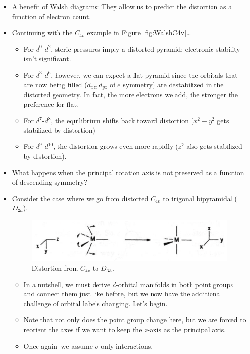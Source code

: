 \documentclass[../notes.tex]{subfiles}
\begin{document}
\begin{itemize}
\begin{itemize}
    \end{itemize}
    \item A benefit of Walsh diagrams: They allow us to predict the distortion as a function of electron count.
    \item Continuing with the $C_{4v}$ example in Figure \ref{fig:WalshC4v}\dots
    \begin{itemize}
        \item For $d^0$-$d^2$, steric pressures imply a distorted pyramid; electronic stability isn't significant.
        \item For $d^3$-$d^6$, however, we can expect a flat pyramid since the orbitals that are now being filled ($d_{xz},d_{yz}$ of $e$ symmetry) are destabilized in the distorted geometry. In fact, the more electrons we add, the stronger the preference for flat.
        \item For $d^7$-$d^8$, the equilibrium shifts back toward distortion ($x^2-y^2$ gets stabilized by distortion).
        \item For $d^9$-$d^{10}$, the distortion grows even more rapidly ($z^2$ also gets stabilized by distortion).
    \end{itemize}
    \item What happens when the principal rotation axis is not preserved as a function of descending symmetry?
    \item Consider the case where we go from distorted $C_{4v}$ to trigonal bipyramidal ($D_{3h}$).
    \begin{figure}[h!]
        \centering
        \includegraphics[width=0.5\linewidth]{../ExtFiles/DistortC4vD3h.png}
        \caption{Distortion from $C_{4v}$ to $D_{3h}$.}
        \label{fig:DistortC4vD3h}
    \end{figure}
    \begin{itemize}
        \item In a nutshell, we must derive $d$-orbital manifolds in both point groups and connect them just like before, but we now have the additional challenge of orbital labels changing. Let's begin.
        \item Note that not only does the point group change here, but we are forced to reorient the axes if we want to keep the $z$-axis as the principal axis.
        \item Once again, we assume $\sigma$-only interactions.

\end{itemize}
\end{itemize}
\end{document}

